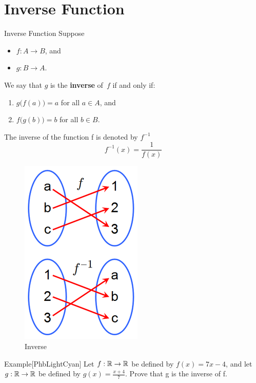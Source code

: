 \documentclass[../MATH-2000-Notes.tex]{subfiles}
\begin{document}
\section{Inverse Function}
\begin{Definition}
    {Inverse Function}
    Suppose
    \begin{itemize}
        \item $f \colon A \to B$,
              and
        \item $g \colon B \to A$.
    \end{itemize}
    We say that $g$ is the \textbf{inverse} of~$f$ if and only if:
    \begin{enumerate} \renewcommand{\theenumi}{\alph{enumi}}
        \item $g \bigl( f(a) \bigr) = a$ for all $a \in A$,
              and
        \item $f \bigl( g(b) \bigr) = b$ for all $b \in B$.
    \end{enumerate}

    The inverse of the function f is denoted by \(f^{-1}\)  \[f^{-1}(x) = \frac{1}{f(x)}\]
\end{Definition}
\begin{figure}[htbp]
    \centering
    \includegraphics[width=0.6\columnwidth]{../Assets/220px-Inverse_Function.png}
    \caption{Inverse}
    \label{fig:inverse}
\end{figure}
\newpage
\begin{commentbox}{Example}[{PhbLightCyan}]
    Let \(f: \mathbb{R} \rightarrow \mathbb{R}\) be defined by \(f(x) = 7x - 4\), and let \(g: \mathbb{R} \rightarrow \mathbb{R}\) be defined by \(g(x) = \frac{x + 4}{7}\). Prove that g is the inverse of f.
\end{commentbox}
\end{document}
